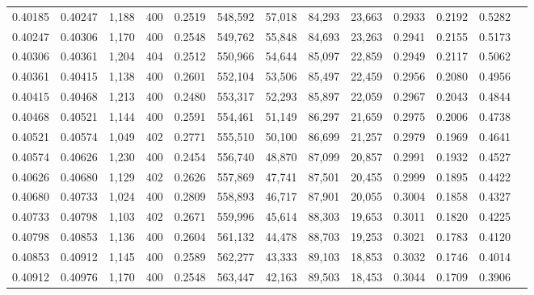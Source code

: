 \begin{tabular}{rrrrrrrrrrrrr}
0.40185 & 0.40247 &  1,188 & 400 &                                     0.2519 & 548,592 &  57,018 &  84,293 &  23,663 & 0.2933 & 0.2192 & 0.5282 \\
0.40247 & 0.40306 &  1,170 & 400 &                                     0.2548 & 549,762 &  55,848 &  84,693 &  23,263 & 0.2941 & 0.2155 & 0.5173 \\
0.40306 & 0.40361 &  1,204 & 404 &                                     0.2512 & 550,966 &  54,644 &  85,097 &  22,859 & 0.2949 & 0.2117 & 0.5062 \\
0.40361 & 0.40415 &  1,138 & 400 &                                     0.2601 & 552,104 &  53,506 &  85,497 &  22,459 & 0.2956 & 0.2080 & 0.4956 \\
0.40415 & 0.40468 &  1,213 & 400 &                                     0.2480 & 553,317 &  52,293 &  85,897 &  22,059 & 0.2967 & 0.2043 & 0.4844 \\
0.40468 & 0.40521 &  1,144 & 400 &                                     0.2591 & 554,461 &  51,149 &  86,297 &  21,659 & 0.2975 & 0.2006 & 0.4738 \\
0.40521 & 0.40574 &  1,049 & 402 &                                     0.2771 & 555,510 &  50,100 &  86,699 &  21,257 & 0.2979 & 0.1969 & 0.4641 \\
0.40574 & 0.40626 &  1,230 & 400 &                                     0.2454 & 556,740 &  48,870 &  87,099 &  20,857 & 0.2991 & 0.1932 & 0.4527 \\
0.40626 & 0.40680 &  1,129 & 402 &                                     0.2626 & 557,869 &  47,741 &  87,501 &  20,455 & 0.2999 & 0.1895 & 0.4422 \\
0.40680 & 0.40733 &  1,024 & 400 &                                     0.2809 & 558,893 &  46,717 &  87,901 &  20,055 & 0.3004 & 0.1858 & 0.4327 \\
0.40733 & 0.40798 &  1,103 & 402 &                                     0.2671 & 559,996 &  45,614 &  88,303 &  19,653 & 0.3011 & 0.1820 & 0.4225 \\
0.40798 & 0.40853 &  1,136 & 400 &                                     0.2604 & 561,132 &  44,478 &  88,703 &  19,253 & 0.3021 & 0.1783 & 0.4120 \\
0.40853 & 0.40912 &  1,145 & 400 &                                     0.2589 & 562,277 &  43,333 &  89,103 &  18,853 & 0.3032 & 0.1746 & 0.4014 \\
0.40912 & 0.40976 &  1,170 & 400 &                                     0.2548 & 563,447 &  42,163 &  89,503 &  18,453 & 0.3044 & 0.1709 & 0.3906 \\

\end{tabular}
